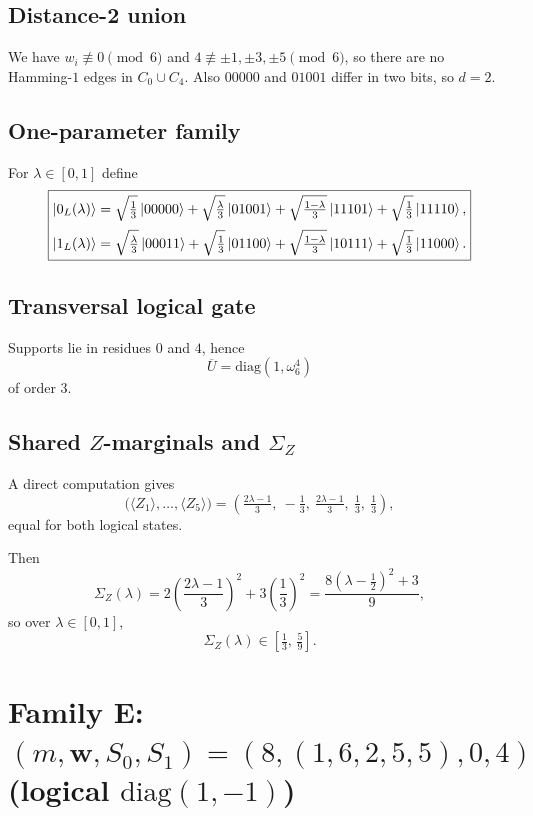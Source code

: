 \documentclass[11pt]{article}
\begin{document}
\subsection{Distance-2 union}
We have $w_i\not\equiv 0\pmod 6$ and $4\not\equiv \pm 1,\pm 3,\pm 5\pmod 6$,
so there are no Hamming-$1$ edges in $C_0\cup C_4$.
Also $00000$ and $01001$ differ in two bits, so $d=2$.

\subsection{One-parameter family}
For $\lambda\in[0,1]$ define
\[
\boxed{
\begin{aligned}
\ket{0_L(\lambda)}
&=
\sqrt{\tfrac13}\ket{00000}
+\sqrt{\tfrac{\lambda}{3}}\ket{01001}
+\sqrt{\tfrac{1-\lambda}{3}}\ket{11101}
+\sqrt{\tfrac13}\ket{11110},\\[2pt]
\ket{1_L(\lambda)}
&=
\sqrt{\tfrac{\lambda}{3}}\ket{00011}
+\sqrt{\tfrac13}\ket{01100}
+\sqrt{\tfrac{1-\lambda}{3}}\ket{10111}
+\sqrt{\tfrac13}\ket{11000}.
\end{aligned}}
\]

\subsection{Transversal logical gate}
Supports lie in residues $0$ and $4$, hence
\[
\overline U=\mathrm{diag}(1,\omega_6^{4})
\]
of order $3$.

\subsection{Shared $Z$-marginals and $\Sigma_Z$}
A direct computation gives
\[
\boxed{
\bigl(\langle Z_1\rangle,\dots,\langle Z_5\rangle\bigr)
=
\left(\tfrac{2\lambda-1}{3},\ -\tfrac13,\ \tfrac{2\lambda-1}{3},\ \tfrac13,\ \tfrac13\right),
}
\]
equal for both logical states.

Then
\[
\Sigma_Z(\lambda)=2\left(\frac{2\lambda-1}{3}\right)^2+3\left(\frac13\right)^2
=\frac{8\left(\lambda-\tfrac12\right)^2+3}{9},
\]
so over $\lambda\in[0,1]$,
\[
\boxed{\Sigma_Z(\lambda)\in\left[\tfrac13,\,\tfrac59\right].}
\]

\bigskip

\section{Family E: $(m,\mathbf w,S_0,S_1)=(8,(1,6,2,5,5),0,4)$ (logical $\mathrm{diag}(1,-1)$)}
\end{document}
